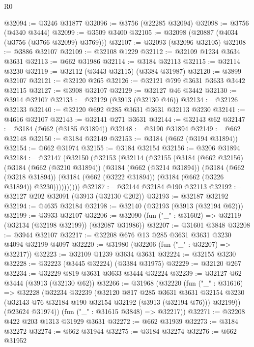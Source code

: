 \begin{lexlean}{R0}
\begin{coremodule}
@32094 := @3246 @31877
@32096 := @3756 (@22285 @32094)
@32098 := @3756 (@4340 @3444)
@32099 := @3509 @3400
@32105 := @32098 (@20887 (@4034 (@3756 (@3766 @32099) @3769)))
@32107 := @32093 (@32096 @32105)
@32108 := @3886 @32107
@32109 := @32108 @1229
@32112 := @32109 @1234 @3634 @3631
@32113 := @662 @31986
@32114 := @3184 @32113
@32115 := @32114 @3230
@32119 := @32112 (@3443 @32115) (@3384 @31987)
@32120 := @3899 @32107
@32121 := @32120 @265
@32126 := @32121 @799 @3631 @3633 @3442 @32115
@32127 := @3908 @32107
@32129 := @32127 @46 @3442
@32130 := @3914 @32107
@32133 := @32129 (@3913 (@32130 @46))
@32134 := @32126 @32133
@32140 := @32120 @692 @285 @3631 @3631 @32113 @3230
@32141 := @4616 @32107
@32143 := @32141 @271 @3631
@32144 := @32143 @62
@32147 := @3184 (@662 (@3185 @31894))
@32148 := @3190 @31894
@32149 := @662 @32148
@32150 := @3184 @32149
@32153 := @3184 (@662 (@3194 @31894))
@32154 := @662 @31974
@32155 := @3184 @32154
@32156 := @3206 @31894
@32184 := @32147
    (@32150
      (@32153
        (@32114
          (@32155
            (@3184
              (@662 @32156)
              (@3184
                (@662 (@3210 @31894))
                (@3184
                  (@662 (@3214 @31894))
                  (@3184
                    (@662 (@3218 @31894))
                    (@3184 (@662 (@3222 @31894)) (@3184 (@662 (@3226 @31894)) @3230))))))))))
@32187 := @32144 @32184 @190 @32113
@32192 := @32127 @202 @32091 (@3913 (@32130 @202))
@32193 := @32187 @32192
@32194 := @4635 @32184
@32198 := @32140 (@32193 (@3913 (@32194 @62)))
@32199 := @3933 @32107
@32206 := @32090 (fun ("_" : @31602) => @32119 (@32134 (@32198 @32199)) (@32087 @31986))
@32207 := @31601 @3848
@32208 := @3944 @32107
@32217 := @32208 @676 @13 @285 @3631 @3631 @3230 @4094 @32199 @4097
@32220 := @31980 (@32206 (fun ("_" : @32207) => @32217))
@32223 := @32109 @1239 @3634 @3631
@32224 := @32155 @3230
@32228 := @32223 (@3445 @32224) (@3384 @31975)
@32229 := @32120 @267
@32234 := @32229 @819 @3631 @3633 @3444 @32224
@32239 := @32127 @62 @3444 (@3913 (@32130 @62))
@32266 := @31968
    (@32220
      (fun ("_" : @31616) =>
      @32228
        (@32234
          @32239
          (@32120
            @817
            @285
            @3631
            @3631
            @32154
            @3230
            (@32143 @76 @32184 @190 @32154 @32192 (@3913 (@32194 @76)))
            @32199))
        (@23624 @31974))
      (fun ("_" : @31615 @3848) => @32217))
@32271 := @32208 @422 @203 @1313 @31929 @3631
@32272 := @662 @31939
@32273 := @3184 @32272
@32274 := @662 @31944
@32275 := @3184 @32274
@32276 := @662 @31952

\end{coremodule}
\end{lexlean}
